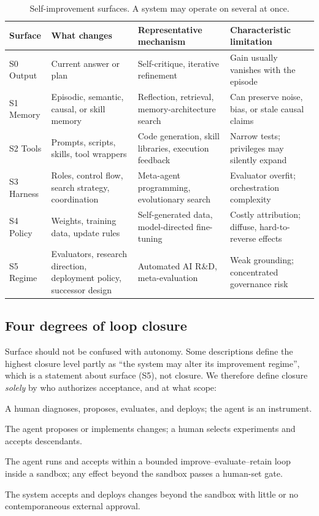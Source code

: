 \documentclass[11pt,a4paper]{article}
\begin{document}
\begin{table}[t]
\centering\small
\caption{Self-improvement surfaces. A system may operate on several at once.}
\label{tab:surfaces}
\begin{tabularx}{\textwidth}{>{\raggedright\arraybackslash}p{1.7cm} >{\raggedright\arraybackslash}p{3.1cm} >{\raggedright\arraybackslash}X >{\raggedright\arraybackslash}p{3.8cm}}
\toprule
\textbf{Surface} & \textbf{What changes} & \textbf{Representative mechanism} & \textbf{Characteristic limitation}\\
\midrule
S0 Output & Current answer or plan & Self-critique, iterative refinement & Gain usually vanishes with the episode\\
S1 Memory & Episodic, semantic, causal, or skill memory & Reflection, retrieval, memory-architecture search & Can preserve noise, bias, or stale causal claims\\
S2 Tools & Prompts, scripts, skills, tool wrappers & Code generation, skill libraries, execution feedback & Narrow tests; privileges may silently expand\\
S3 Harness & Roles, control flow, search strategy, coordination & Meta-agent programming, evolutionary search & Evaluator overfit; orchestration complexity\\
S4 Policy & Weights, training data, update rules & Self-generated data, model-directed fine-tuning & Costly attribution; diffuse, hard-to-reverse effects\\
S5 Regime & Evaluators, research direction, deployment policy, successor design & Automated AI R\&D, meta-evaluation & Weak grounding; concentrated governance risk\\
\bottomrule
\end{tabularx}
\end{table}

\subsection{Four degrees of loop closure}\label{sec:closure}

Surface should not be confused with autonomy. Some descriptions define the highest closure level partly as ``the system may alter its improvement regime'', which is a statement about surface (S5), not closure. We therefore define closure \emph{solely} by who authorizes acceptance, and at what scope:
\begin{description}[leftmargin=2.2em,style=sameline,font=\normalfont\bfseries]
\item[C0] A human diagnoses, proposes, evaluates, and deploys; the agent is an instrument.
\item[C1] The agent proposes or implements changes; a human selects experiments and accepts descendants.
\item[C2] The agent runs and accepts within a bounded improve--evaluate--retain loop inside a sandbox; any effect beyond the sandbox passes a human-set gate.
\item[C3] The system accepts and deploys changes beyond the sandbox with little or no contemporaneous external approval.
\end{description}
\end{document}
